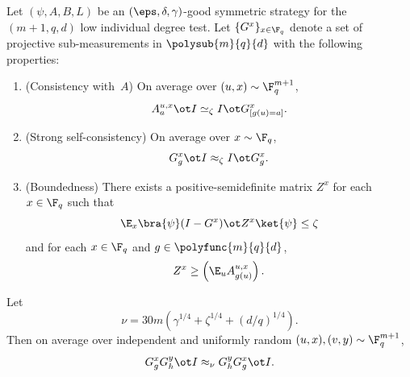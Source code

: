 \begin{theorem}[Commutativity of~$G$]\label{thm:com-main}
	\leanok
	Let $(\psi,A,B,L)$ be an $(\eps,\delta,\gamma)$-good symmetric strategy for the $(m+1,q,d)$ low individual degree test.
	Let $\{G^x\}_{x \in \F_q}$ denote a set of projective sub-measurements in $\polysub{m}{q}{d}$ with the following properties:
	\begin{enumerate}
		\item (Consistency with~$A$)\label{item:commuting-consistency}
		      On average over $(u,x) \sim \F_q^{m+1}$,
		      \[
			      A_a^{u,x} \ot I \simeq_\zeta I \ot G^x_{[g(u)=a]}.
		      \]
		\item (Strong self-consistency)\label{item:commuting-self-consistency}
		      On average over $x \sim \F_q$,
		      \[
			      G_g^x \ot I \approx_\zeta I \ot G_g^x.
		      \]
		\item (Boundedness)\label{item:commuting-boundedness}
		      There exists a positive-semidefinite matrix $Z^x$ for each $x \in \F_q$ such that
		      \[
			      \E_x \bra{\psi} (I-G^x) \ot Z^x \ket{\psi} \le \zeta
		      \]
		      and for each $x \in \F_q$ and $g \in \polyfunc{m}{q}{d}$,
		      \[
			      Z^x \ge \left(\E_u A_{g(u)}^{u,x}\right).
		      \]
	\end{enumerate}
	Let
	\[
		\nu = 30m\left(\gamma^{1/4}+\zeta^{1/4}+(d/q)^{1/4}\right).
	\]
	Then on average over independent and uniformly random $(u,x),(v,y) \sim \F_q^{m+1}$,
	\[
		G_g^x G_h^y \ot I \approx_\nu G_h^y G_g^x \ot I.
	\]
\end{theorem}
